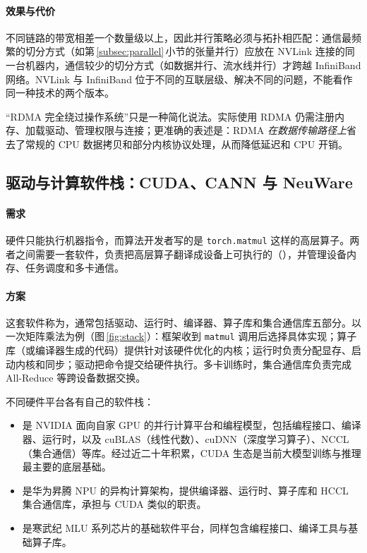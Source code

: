 

\paragraph{效果与代价} 不同链路的带宽相差一个数量级以上，因此并行策略必须与拓扑相匹配：通信最频繁的切分方式（如第\,\ref{subsec:parallel}\,小节的张量并行）应放在 NVLink 连接的同一台机器内，通信较少的切分方式（如数据并行、流水线并行）才跨越 InfiniBand 网络。NVLink 与 InfiniBand 位于不同的互联层级、解决不同的问题，不能看作同一种技术的两个版本。

\begin{pitfall}
“RDMA 完全绕过操作系统”只是一种简化说法。实际使用 RDMA 仍需注册内存、加载驱动、管理权限与连接；更准确的表述是：RDMA \emph{在数据传输路径上}省去了常规的 CPU 数据拷贝和部分内核协议处理，从而降低延迟和 CPU 开销。
\end{pitfall}

\subsection{驱动与计算软件栈：CUDA、CANN 与 NeuWare}
\label{subsec:stack}

\paragraph{需求} 硬件只能执行机器指令，而算法开发者写的是 \texttt{torch.matmul} 这样的高层算子。两者之间需要一套软件，负责把高层算子翻译成设备上可执行的（），并管理设备内存、任务调度和多卡通信。

\paragraph{方案} 这套软件称为，通常包括驱动、运行时、编译器、算子库和集合通信库五部分。以一次矩阵乘法为例（图\,\ref{fig:stack}）：框架收到 \texttt{matmul} 调用后选择具体实现；算子库（或编译器生成的代码）提供针对该硬件优化的内核；运行时负责分配显存、启动内核和同步；驱动把命令提交给硬件执行。多卡训练时，集合通信库负责完成 All-Reduce 等跨设备数据交换。



不同硬件平台各有自己的软件栈：
\begin{itemize}
  \item {} 是 NVIDIA 面向自家 GPU 的并行计算平台和编程模型，包括编程接口、编译器、运行时，以及 cuBLAS（线性代数）、cuDNN（深度学习算子）、NCCL（集合通信）等库\cite{nvidia2024cuda}。经过近二十年积累，CUDA 生态是当前大模型训练与推理最主要的底层基础。
  \item {} 是华为昇腾 NPU 的异构计算架构，提供编译器、运行时、算子库和 HCCL 集合通信库，承担与 CUDA 类似的职责。
  \item {} 是寒武纪 MLU 系列芯片的基础软件平台，同样包含编程接口、编译工具与基础算子库。
\end{itemize}

